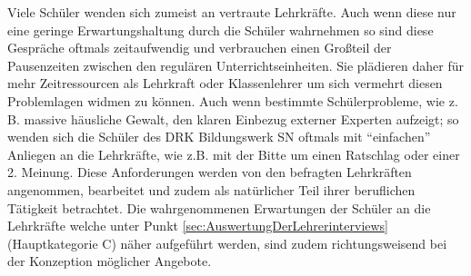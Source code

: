 Viele Schüler wenden sich zumeist an vertraute Lehrkräfte. Auch wenn diese nur eine geringe Erwartungshaltung durch die Schüler wahrnehmen so sind diese Gespräche oftmals zeitaufwendig und verbrauchen einen Großteil der Pausenzeiten zwischen den regulären Unterrichtseinheiten. Sie plädieren daher für mehr Zeitressourcen als Lehrkraft oder Klassenlehrer um sich vermehrt diesen Problemlagen widmen zu können. Auch wenn bestimmte Schülerprobleme, wie z. B. massive häusliche Gewalt, den klaren Einbezug externer Experten aufzeigt; so wenden sich die Schüler des DRK Bildungswerk SN oftmals mit "`einfachen"' Anliegen an die Lehrkräfte, wie z.B. mit der Bitte um einen Ratschlag oder einer 2. Meinung. Diese Anforderungen werden von den befragten Lehrkräften angenommen, bearbeitet und zudem als natürlicher Teil ihrer beruflichen Tätigkeit betrachtet. Die wahrgenommenen Erwartungen der Schüler an die Lehrkräfte welche unter Punkt \ref{sec:AuswertungDerLehrerinterviews} (Hauptkategorie C) näher aufgeführt werden, sind zudem richtungsweisend bei der Konzeption möglicher Angebote.
